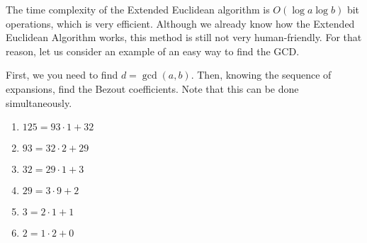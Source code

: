 \documentclass[../lecture-notes-148x210.tex]{subfiles}
\begin{document}
The time complexity of the Extended Euclidean algorithm is $O(\log{a} \log{b})$ bit
operations, which is very efficient. Although we already know how the
Extended Euclidean Algorithm works, this method is still not very
human-friendly. For that reason, let us consider an example of an easy way to
find the GCD.

\begin{example} 
    \hfill

    First, we you need to find $d = \gcd(a,b)$. Then, knowing the sequence of
    expansions, find the Bezout coefficients. Note that this can be done
    simultaneously.

    \hfill

    \begin{minipage}{0.4\textwidth}
        \raggedright
        \vspace*{\fill}
            \begin{enumerate}
                \item $125 = 93 \cdot 1 + 32$
                \item $93 = 32 \cdot 2 + 29$
                \item $32 = 29 \cdot 1 + 3$
                \item $29 = 3 \cdot 9 + 2$
                \item $3 = 2 \cdot 1 + 1$
                \item $2 = 1 \cdot 2 + 0$        
            \end{enumerate}
        \vspace*{\fill}
    \end{minipage}
    \begin{minipage}{0.7\textwidth}
\end{minipage}
\end{example}
\end{document}
